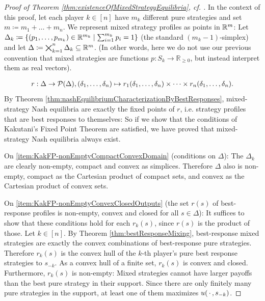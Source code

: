 \documentclass[a4paper,DIV=11,abstracton,twoside=semi]{scrreprt}
\newcommand{\Rp}{\mathbb{R}_{\geq 0}}
\theoremstyle{definition}
\begin{document}
    \begin{proof}[Proof of Theorem \ref{thm:existenceOfMixedStrategyEquilibria}, cf. {\cite[p.29]{bib:fudenbergGameTheory}}]
        In the context of this proof, let each player $k \in [n]$ have $m_k$ different pure strategies and set $m \coloneqq m_1 + \dots + m_n$.
        We represent mixed strategy profiles as points in $\mathbb{R}^m$: Let $\Delta_k \coloneqq \{(p_1, \dots, p_{m_k}) \in \mathbb{R}^{m_k} \mid \sum_{i=1}^{m_k} p_i = 1\}$ (the standard $(m_k - 1)$-simplex) and let $\Delta \coloneqq \bigtimes_{k=1}^n \Delta_k \subseteq \mathbb{R}^m$. (In other words, here we do not use our previous convention that mixed strategies are functions $p: S_k \to \Rp$, but instead interpret them as real vectors).
        
        \begin{gather}
            r: \Delta \to \operatorname{\mathcal{P}}(\Delta), (\delta_1, \dots, \delta_n) \mapsto r_1(\delta_1, \dots, \delta_n) \times \dots \times r_n(\delta_1, \dots, \delta_n).
            \label{eq:bestResponseCorresponenceDefinition}
        \end{gather}
        By Theorem \ref{thm:nashEquilibriumCharacterizationByBestResponses}, mixed-strategy Nash equilibria are exactly the fixed points of $r$, i.e. strategy profiles that are best responses to themselves: So if we show that the conditions of Kakutani's Fixed Point Theorem are satisfied, we have proved that mixed-strategy Nash equilibria always exist.
        
        On \ref{item:KakFP-nonEmptyCompactConvexDomain} (conditions on $\Delta$): The $\Delta_k$ are clearly non-empty, compact and convex as simplices. Therefore $\Delta$ also is non-empty,
        compact as the Cartesian product of compact sets, and convex as the Cartesian product of convex sets. %
        
        On \ref{item:KakFP-nonEmptyConvexClosedOutputs} (the set $r(s)$ of best-response profiles is non-empty, convex and closed for all $s \in \Delta$): It suffices to show that these conditions hold for each $r_k(s)$, since $r(s)$ is the product of those. Let $k \in [n]$. By Theorem \ref{thm:bestResponseMixing}, best-response mixed strategies are exactly the convex combinations of best-response pure strategies. Therefore $r_k(s)$ is the convex hull of the $k$-th player's pure best response strategies to $s_{-k}$. As a convex hull of a finite set, $r_k(s)$ is convex and closed.
        Furthermore, $r_k(s)$ is non-empty: Mixed strategies cannot have larger payoffs than the best pure strategy in their support. Since there are only finitely many pure strategies in the support, at least one of them maximizes $u(\,\cdot\,, s_{-k})$.
        

\end{proof}
\end{document}
